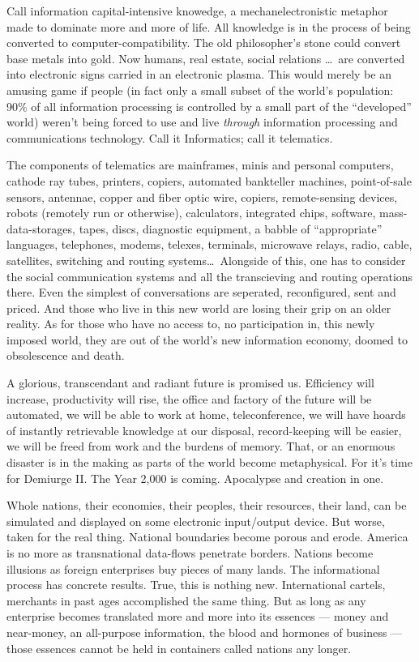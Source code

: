 \documentclass[11pt,twoside,draft]{memoir}
\begin{document}
Call information capital-intensive knowedge, a mechanelectronistic metaphor made to dominate more and more of life. All knowledge is in the process of being converted to computer-compatibility. The old philosopher's stone could convert base metals into gold. Now humans, real estate, social relations \ldots\ are converted into electronic signs carried in an electronic plasma. This would merely be an amusing game if people (in fact only a small subset of the world's population: 90\% of all information processing is controlled by a small part of the \enquote{developed} world) weren't being forced to use and live \emph{through} information processing and communications technology. Call it Informatics; call it telematics.

The components of telematics are mainframes, minis and personal computers, cathode ray tubes, printers, copiers, automated bankteller machines, point-of-sale sensors, antennae, copper and fiber optic wire, copiers, remote-sensing devices, robots (remotely run or otherwise), calculators, integrated chips, software, mass-data-storages, tapes, discs, diagnostic equipment, a babble of \enquote{appropriate} languages, telephones, modems, telexes, terminals, microwave relays, radio, cable, satellites, switching and routing systems\ldots\ Alongside of this, one has to consider the social communication systems and all the transcieving and routing operations there. Even the simplest of conversations are seperated, reconfigured, sent and priced. And those who live in this new world are losing their grip on an older reality. As for those who have no access to, no participation in, this newly imposed world, they are out of the world's new information economy, doomed to obsolescence and death.

A glorious, transcendant and radiant future is promised us. Efficiency will increase, productivity will rise, the office and factory of the future will be automated, we will be able to work at home, teleconference, we will have hoards of instantly retrievable knowledge at our disposal, record-keeping will be easier, we will be freed from work and the burdens of memory. That, or an enormous disaster is in the making as parts of the world become metaphysical. For it's time for Demiurge II. The Year 2,000 is coming. Apocalypse and creation in one.

Whole nations, their economies, their peoples, their resources, their land, can be simulated and displayed on some electronic input/output device. But worse, taken for the real thing. National boundaries become porous and erode. America is no more as trans\-national data-flows penetrate borders. Nations become illusions as foreign enterprises buy pieces of many lands. The informational process has concrete results. True, this is nothing new. International cartels, merchants in past ages accomplished the same thing. But as long as any enterprise becomes translated more and more into its essences --- money and near-money, an all-purpose information, the blood and hormones of business --- those essences cannot be held in containers called nations any longer.
\end{document}
